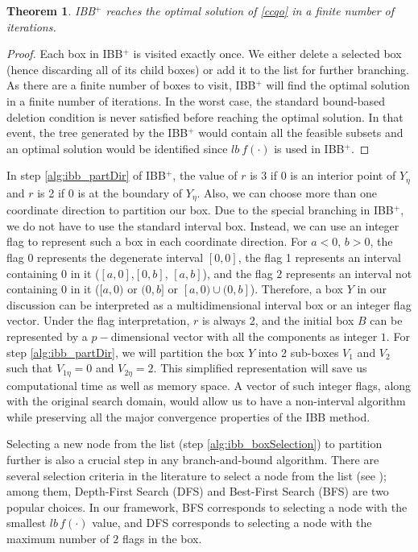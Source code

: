 \documentclass[10pt, letterpaper]{article}
\newtheorem{theorem}{Theorem}[section]
\begin{document}
\begin{theorem}
\textup{IBB$^{+}$} reaches the optimal solution of \eqref{ccqo} in a finite number of iterations.
\end{theorem}
\begin{proof}
Each box in IBB$^{+}$ is visited exactly once. We either delete a selected box (hence discarding all of its child boxes) or add it to the list for further branching. As there are a finite number of boxes to visit, IBB$^{+}$ will find the optimal solution in a finite number of iterations. In the worst case, the standard bound-based deletion condition is never satisfied before reaching the optimal solution. In that event, the tree generated by the IBB$^{+}$ would contain all the feasible subsets and an optimal solution would be identified since $lb \> f(\cdot)$ is used in IBB$^{+}$. 
\end{proof}

In step \ref{alg:ibb_partDir} of IBB$^{+}$, the value of $r$ is 3 if $0$ is an interior point of $Y_{\eta}$ and $r$ is 2 if $0$ is at the boundary of $Y_{\eta}$. Also, we can choose more than one coordinate direction to partition our box.  
Due to the special branching in IBB$^{+}$, we do not have to use the standard interval box. Instead, we can use an integer flag to represent such a box in each coordinate direction. For $a<0$, $b>0$, the flag $0$ represents the degenerate interval $[0,0]$, the flag 1 represents an interval containing $0$ in it ($[a,0]$,$[0,b]$, $[a,b]$), and the flag $2$ represents an interval not containing $0$ in it ($[a,0)$ or $(0,b]$ or $[a,0) \cup (0,b]$). Therefore, a box $Y$ in our discussion can be interpreted as a multidimensional interval box or an integer flag vector. Under the flag interpretation, $r$ is always 2, and the initial box $B$ can be represented by a $p-$dimensional vector with all the components as integer $1$. For step \ref{alg:ibb_partDir}, we will partition the box $Y$ into 2 sub-boxes $V_{1}$ and $V_{2}$ such that $V_{1\eta}=0$ and $V_{2\eta}=2$. This simplified representation will save us computational time as well as memory space. A vector of such integer flags, along with the original search domain, would allow us to have a non-interval algorithm while preserving all the major convergence properties of the IBB method. 

Selecting a new node from the list (step \ref{alg:ibb_boxSelection}) to partition further is also a crucial step in any branch-and-bound algorithm. There are several selection criteria in the literature to select a node from the list (see \cite{morrison2016branch}); among them, Depth-First Search (DFS) and Best-First Search (BFS) are two popular choices. In our framework, BFS corresponds to selecting a node with the smallest $lb \, f(\cdot)$ value, and DFS corresponds to selecting a node with the maximum number of $2$ flags in the box. 
\end{document}
